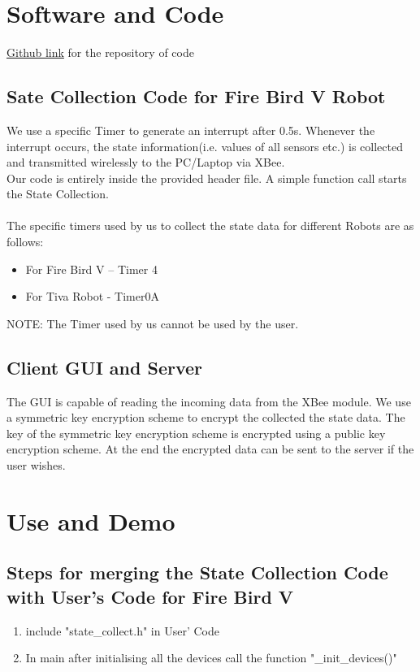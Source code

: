 \documentclass[a4paper,12pt,oneside]{book}
\begin{document}
\newpage
\section{Software and Code}
\href{https://github.com/eYSIP-2016/Robot_State_Collector/tree/master/code}{Github link} for the repository of code
\subsection{Sate Collection Code for Fire Bird V Robot}
We use a specific Timer to generate an interrupt after 0.5s. Whenever the interrupt occurs, the state information(i.e. values of all sensors etc.) is collected and transmitted wirelessly to the PC/Laptop via XBee.\\
    Our code is entirely inside the provided header file. A simple function call starts the State Collection.\\
\\
The specific timers used by us to collect the state data for different Robots are as follows:
\begin{itemize}
\item For Fire Bird V -- Timer 4
\item For Tiva Robot - Timer0A
\end{itemize}

NOTE: The Timer used by us cannot be used by the user. 

\subsection{Client GUI and Server}

The GUI is capable of reading the incoming data from the XBee module. We use a symmetric key encryption scheme to encrypt the collected the state data. The key of the symmetric key encryption scheme is encrypted using a public key encryption scheme. At the end the encrypted data can be sent to the server if the user wishes.

\newpage

\section{Use and Demo}

\subsection{Steps for merging the State Collection Code with User's Code for Fire Bird V}
\begin{enumerate}

\item include "state\_collect.h" in User' Code

\item In main after initialising all the devices call the function  "\_init\_devices()"

\end{enumerate}
\end{document}
